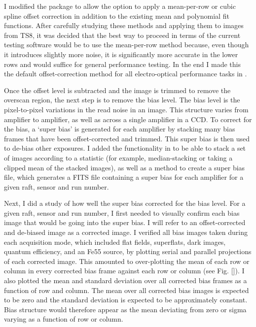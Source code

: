 I modified the  package to allow the option to apply a mean-per-row or cubic spline offset correction in addition to the existing mean and polynomial fit functions. After carefully studying these methods and applying them to images from TS8, it was decided that the best way to proceed in terms of the current testing software would be to use the mean-per-row method because, even though it introduces slightly more noise, it is significantly more accurate in the lower rows and would suffice for general performance testing. In the end I made this the default offset-correction method for all electro-optical performance tasks in .

Once the offset level is subtracted and the image is trimmed to remove the overscan region, the next step is to remove the bias level. The bias level is the pixel-to-pixel variations in the read noise in an image. This structure varies from amplifier to amplifier, as well as across a single amplifier in a CCD. To correct for the bias, a `super bias’ is generated for each amplifier by stacking many bias frames that have been offset-corrected and trimmed. This super bias is then used to de-bias other exposures. I added the functionality in  to be able to stack a set of images according to a statistic (for example, median-stacking or taking a clipped mean of the stacked images), as well as a method to create a super bias file, which generates a FITS file containing a super bias for each amplifier for a given raft, sensor and run number. 

Next, I did a study of how well the super bias corrected for the bias level. For a given raft, sensor and run number, I first needed to visually confirm each bias image that would be going into the super bias. I will refer to an offset-corrected and de-biased image as a corrected image. I verified all bias images taken during each acquisition mode, which included flat fields, superflats, dark images, quantum efficiency, and an Fe55 source, by plotting serial and parallel projections of each corrected image. This amounted to over-plotting the mean of each row or column in every corrected bias frame against each row or column (see Fig. []). I also plotted the mean and standard deviation over all corrected bias frames as a function of row and column. The mean over all corrected bias images is expected to be zero and the standard deviation is expected to be approximately constant. Bias structure would therefore appear as the mean deviating from zero or sigma varying as a function of row or column. 

